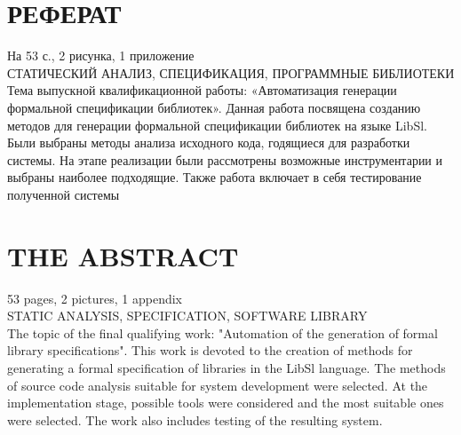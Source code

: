 \chapter*{РЕФЕРАТ}
\thispagestyle{empty}

На 53 с., 2 рисунка, 1 приложение \\

СТАТИЧЕСКИЙ АНАЛИЗ, СПЕЦИФИКАЦИЯ, ПРОГРАММНЫЕ БИБЛИОТЕКИ \\
Тема выпускной квалификационной работы: «Автоматизация генерации формальной спецификации библиотек».
Данная работа посвящена созданию методов для генерации формальной спецификации библиотек на языке LibSl.
Были выбраны методы анализа исходного кода, годящиеся для разработки системы.
На этапе реализации были рассмотрены возможные инструментарии и выбраны наиболее подходящие.
Также работа включает в себя тестирование полученной системы

\newline

\chapter*{THE ABSTRACT}
\thispagestyle{empty}

53 pages, 2 pictures, 1 appendix \\

STATIC ANALYSIS, SPECIFICATION, SOFTWARE LIBRARY \\

The topic of the final qualifying work: "Automation of the generation of formal library specifications".
This work is devoted to the creation of methods for generating a formal specification of libraries in the LibSl language.
The methods of source code analysis suitable for system development were selected.
At the implementation stage, possible tools were considered and the most suitable ones were selected.
The work also includes testing of the resulting system.